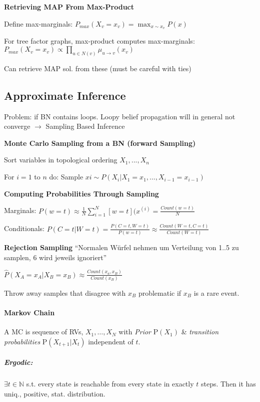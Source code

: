 \documentclass[a4paper, 10pt]{scrartcl}
\newcommand{\uP}{\mathrm P}
\begin{document}
\begin{multicols*}{3}
 \textbf{Retrieving MAP From Max-Product}
 \begin{compactitem}
 \item Define max-marginals: $P_{max}(X_v =x_v) = \max_{x \sim x_v} P(x)$
 \item For tree factor graphs, max-product computes max-marginals: 
 $P_{max}(X_v = x_v) \propto \prod_{u \in N(v)} \mu_{u \rightarrow v} (x_v)$ 
\item Can retrieve MAP sol. from these (must be careful with ties)
\end{compactitem}
\subsection{Approximate Inference}
Problem: if BN contains loops.
Loopy belief propagation will in general not converge	$\rightarrow$ Sampling Based Inference

\textbf{Monte Carlo Sampling from a BN (forward Sampling)}
\begin{compactitem}
	\item Sort variables in topological ordering $X_1,...,X_n$
	\item For $i=1$ to 	$n$ do: Sample $xi \sim P(X_i | X_1=x_1, ..., X_{i-1}=x_{i-1})$
\end{compactitem}

\textbf{Computing Probabilities Through Sampling}

Marginals: $P(w=t) \approx \frac{1}{N} \sum_{i=1}^{N}[w=t](x^{(i)} =\frac{ Count(w=t)}{N}$

Conditionals: $P(C=t | W=t) = \frac{P(C=t, W=t)}{P(w=t)} \approx \frac{Count(W=t, C=t)}{Count(W=t)}$

\textbf{Rejection Sampling}
``Normalen Würfel nehmen um Verteilung von 1..5 zu samplen, 6 wird jeweils ignoriert''

$\hat{P}(X_A = x_A | X_B = x_B) \approx \frac{Count(x_a, x_B)}{Count(x_B)}$

Throw away samples that disagree with $x_B$ problematic if $x_B$ is a rare event.

\paragraph{Markov Chain}

A MC is sequence of RVs, $X_1,\dots,X_N$ with \emph{Prior} $\uP(X_1)$ \& \emph{transition probabilities} $\uP(X_{t+1} | X_t)$ independent of $t$.

\subparagraph{Ergodic:} $\exists t\in{\mathbb N}$ s.t. every state is reachable from every state in exactly $t$ steps.
Then it has uniq., positive, stat. distribution.


\end{multicols*}
\end{document}
